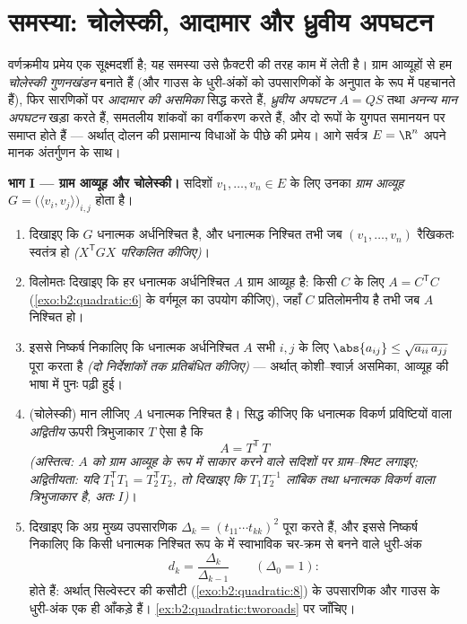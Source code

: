 \section{समस्या: चोलेस्की, आदामार और ध्रुवीय अपघटन}

\begin{problem}\label{pb:b2:quadratic:1}
वर्णक्रमीय प्रमेय एक सूक्ष्मदर्शी है; यह समस्या उसे फ़ैक्टरी की तरह काम
में लेती है। ग्राम आव्यूहों से हम \emph{चोलेस्की
गुणनखंडन} बनाते हैं (और गाउस के धुरी-अंकों को
उपसारणिकों के अनुपात के रूप में पहचानते हैं), फिर सारणिकों पर \emph{आदामार
की असमिका} सिद्ध करते हैं, \emph{ध्रुवीय
अपघटन} $A =
QS$ तथा \emph{अनन्य मान अपघटन} खड़ा करते हैं,
समतलीय शांकवों का वर्गीकरण करते हैं, और दो रूपों के युगपत समानयन पर
समाप्त होते हैं --- अर्थात् दोलन की प्रसामान्य विधाओं के पीछे की प्रमेय।
आगे सर्वत्र $E =
\R^n$ अपने मानक अंतर्गुणन के साथ।

\medskip
\noindent\textbf{भाग I --- ग्राम आव्यूह और चोलेस्की।} सदिशों $v_1, \dots, v_n \in E$ के लिए
उनका \emph{ग्राम आव्यूह} $G = \bigl(\langle v_i, v_j\rangle\bigr)_{i,j}$ होता है।
\begin{enumerate}
  \item दिखाइए कि $G$  धनात्मक अर्धनिश्चित है, और धनात्मक निश्चित
        तभी जब $(v_1, \dots, v_n)$ रैखिकतः स्वतंत्र हो \emph{($X^{\mathsf T}GX$ परिकलित कीजिए)}।
  \item विलोमतः दिखाइए कि हर  धनात्मक अर्धनिश्चित $A$ ग्राम आव्यूह
        है: किसी $C$ के लिए $A = C^{\mathsf T}C$ (\cref{exo:b2:quadratic:6} के वर्गमूल का उपयोग कीजिए), जहाँ $C$
        प्रतिलोमनीय है तभी जब $A$ निश्चित हो।
  \item इससे निष्कर्ष निकालिए कि धनात्मक अर्धनिश्चित $A$ सभी $i,
        j$ के लिए
        $\abs{a_{ij}} \leq \sqrt{a_{ii}\,a_{jj}}$ पूरा करता है \emph{(दो निर्देशांकों तक प्रतिबंधित कीजिए)}
        --- अर्थात् कोशी--श्वार्ज़ असमिका, आव्यूह की भाषा में पुनः पढ़ी
        हुई।
  \item (चोलेस्की) मान लीजिए $A$ धनात्मक निश्चित है। सिद्ध कीजिए कि
        धनात्मक विकर्ण प्रविष्टियों वाला \emph{अद्वितीय} ऊपरी त्रिभुजाकार
        $T$ ऐसा है कि
        \[
        A = T^{\mathsf T}\,T
        \]
        \emph{(अस्तित्व: $A$ को ग्राम आव्यूह के रूप में साकार करने वाले
        सदिशों पर ग्राम--श्मिट लगाइए; अद्वितीयता: यदि $T_1^{\mathsf T}T_1 = T_2^{\mathsf T}T_2$, तो दिखाइए कि
        $T_1T_2^{-1}$ लांबिक तथा धनात्मक विकर्ण वाला त्रिभुजाकार है, अतः $I$)}।
  \item दिखाइए कि अग्र मुख्य उपसारणिक $\Delta_k = (t_{11}\cdots t_{kk})^2$ पूरा करते हैं, और इससे
        निष्कर्ष निकालिए कि किसी धनात्मक निश्चित रूप के  में
        स्वाभाविक चर-क्रम से बनने वाले धुरी-अंक
        \[
        d_k = \frac{\Delta_k}{\Delta_{k-1}}
        \qquad (\Delta_0 = 1) :
        \]
        होते हैं: अर्थात् सिल्वेस्टर की कसौटी (\cref{exo:b2:quadratic:8}) के उपसारणिक और गाउस
        के धुरी-अंक एक ही आँकड़े हैं। \cref{ex:b2:quadratic:tworoads} पर जाँचिए।
\end{enumerate}


\end{problem}
